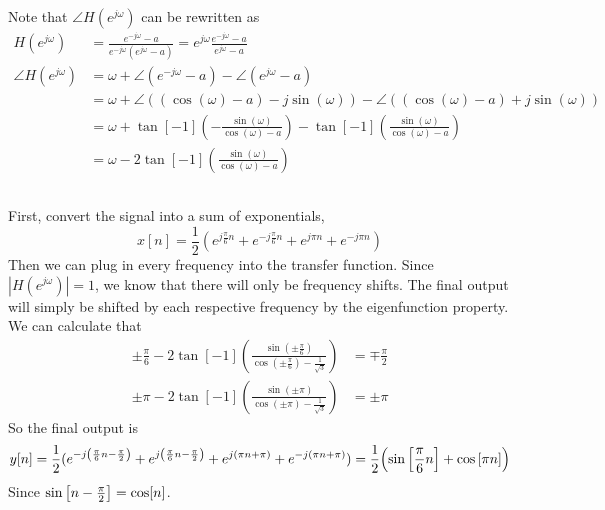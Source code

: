 \documentclass{article}
\begin{document}
\subsection{}

Note that \(\angle H(e^{j \omega})\) can be rewritten as
\begin{align}
    H(e^{j \omega}) &= \frac{e^{-j \omega} - a}{e^{-j \omega} (e^{j \omega} - a)} = e^{j \omega} \frac{e^{-j \omega} - a}{e^{j \omega} - a} \\
    \angle H(e^{j \omega}) &= \omega + \angle(e^{-j \omega} - a) - \angle(e^{j \omega} - a) \\
    &= \omega + \angle((\cos(\omega) - a) - j \sin(\omega)) - \angle ((\cos(\omega) - a) + j \sin(\omega)) \\
    &= \omega + \tan[-1](-\frac{\sin(\omega)}{\cos(\omega) - a}) - \tan[-1](\frac{\sin(\omega)}{\cos(\omega) - a}) \\
    &= \omega - 2\tan[-1](\frac{\sin(\omega)}{\cos(\omega) - a})
\end{align}

\subsection{}

First, convert the signal into a sum of exponentials,
\begin{equation}
    x[n] = \frac{1}{2} (e^{j \frac{\pi}{6} n} + e^{-j \frac{\pi}{6} n} + e^{j \pi n} + e^{-j \pi n})
\end{equation}
Then we can plug in every frequency into the transfer function.
Since \(|H(e^{j \omega})| = 1\), we know that there will only be frequency shifts.
The final output will simply be shifted by each respective frequency by the eigenfunction property.
We can calculate that
\begin{align}
    \pm \frac{\pi}{6} - 2\tan[-1](\frac{\sin(\pm \frac{\pi}{6})}{\cos(\pm \frac{\pi}{6}) - \frac{1}{\sqrt{3}}}) &= \mp \frac{\pi}{2} \\
    \pm \pi - 2\tan[-1](\frac{\sin(\pm \pi)}{\cos(\pm \pi) - \frac{1}{\sqrt{3}}}) &= \pm \pi
\end{align}
So the final output is
\begin{equation}
    y[n] = \frac{1}{2} (e^{-j \qty(\frac{\pi}{6} n - \frac{\pi}{2})} + e^{j \qty(\frac{\pi}{6} n - \frac{\pi}{2})} + e^{j \qty(\pi n + \pi)} + e^{-j \qty(\pi n + \pi)}) = \frac{1}{2} \qty(\sin\qty[\frac{\pi}{6} n] + \cos\qty[\pi n])
\end{equation}
Since \(\sin\qty[n - \frac{\pi}{2}] = \cos[n]\).
\end{document}
